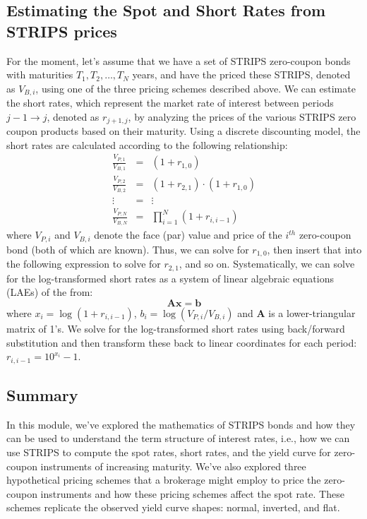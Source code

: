 \documentclass[11pt]{article}
\theoremstyle{definition}
\begin{document}
\subsection{Estimating the Spot and Short Rates from STRIPS prices}
For the moment, let's assume that we have a set of STRIPS zero-coupon bonds with maturities $T_{1}, T_{2},\ldots, T_{N}$ years, 
and have the priced these STRIPS, denoted as $V_{B, i}$, using one of the three pricing schemes described above.
We can estimate the short rates, which represent the market rate of interest between periods $j-1\rightarrow{j}$, denoted as $r_{j+1,j}$, by analyzing the prices of the various STRIPS zero coupon products based on their maturity. Using a discrete discounting model, the short rates are calculated according to the following relationship:
\begin{eqnarray}
\frac{V_{P,1}}{V_{B,1}} & = & \left(1+r_{1,0}\right) \\
\frac{V_{P,2}}{V_{B,2}} & = & \left(1+r_{2,1}\right)\cdot\left(1+r_{1,0}\right) \\
\vdots & = & \vdots \\
\frac{V_{P,N}}{V_{B,N}} & = & \prod_{i=1}^{N}\left(1+r_{i,i-1}\right)
\end{eqnarray}
where $V_{P, i}$ and $V_{B, i}$ denote the face (par) value and price of the $i^{th}$ zero-coupon bond (both of which are known). Thus, we can solve for $r_{1,0}$, then insert that into the following expression to solve for $r_{2,1}$, and so on. Systematically, we can solve for the log-transformed short rates as a system of linear algebraic equations (LAEs) of the from:
\begin{equation}
\mathbf{A}\mathbf{x} = \mathbf{b}
\end{equation}
where $x_{i} = \log\left(1+r_{i,i-1}\right)$, $b_{i} = \log\left(V_{P,i}/V_{B,i}\right)$ and $\mathbf{A}$ is a lower-triangular matrix of 1's. We solve for the log-transformed short rates using back/forward substitution
and then transform these back to linear coordinates for each period: $r_{i,i-1} = 10^{x_{i}} - 1$.

\subsection{Summary}
In this module, we've explored the mathematics of STRIPS bonds and how they can be used to understand the term structure of interest rates, i.e., how we can use STRIPS to compute the spot rates, short rates, and the yield curve for zero-coupon instruments of increasing maturity. 
We've also explored three hypothetical pricing schemes that a brokerage might employ to price the zero-coupon instruments and how these pricing schemes affect the spot rate. These schemes replicate the observed yield curve shapes: normal, inverted, and flat. 
\end{document}
